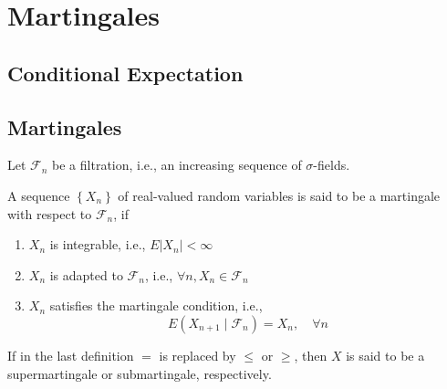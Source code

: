 \chapter{Martingales}

\section{Conditional Expectation}




\section{Martingales}

Let $\mathcal{F}_{n}$ be a filtration, i.e., an increasing sequence of $\sigma$-fields.
\begin{definition}[Martingale]
    A sequence $\left\{X_{n}\right\}$ of real-valued random variables  is said to be a martingale with respect to $\mathcal{F}_{n}$, if
    \begin{enumerate}
        \item $X_{n}$ is integrable, i.e., $E\left|X_{n}\right|<\infty$
        \item $X_{n}$ is adapted to $\mathcal{F}_{n}$, i.e., $\forall n,X_{n}\in \mathcal{F}_{n}$
        \item $X_{n}$ satisfies the martingale condition, i.e.,
              \begin{equation}
                  E\left(X_{n+1}\mid\mathcal{F}_{n}\right)=X_{n},\quad\forall n
              \end{equation}
    \end{enumerate}
\end{definition}

\begin{note}
    If in the last definition $=$ is replaced by $\leq$ or $\geq$, then $X$ is said to be a supermartingale or submartingale, respectively.
\end{note}

